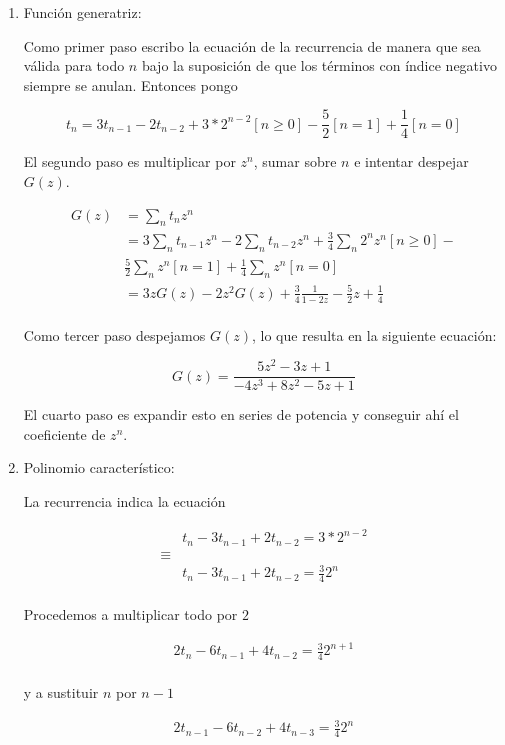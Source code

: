 \documentclass{article}
\begin{document}
\begin{enumerate}

\item Función generatriz:

Como primer paso escribo la ecuación de la recurrencia de manera que sea válida
para todo $n$ bajo la suposición de que los términos con índice negativo siempre
se anulan. Entonces pongo

\[
t_n = 3t_{n-1} - 2t_{n-2} + 3*2^{n-2} [n \geq 0] - \frac{5}{2} [n=1] + \frac{1}{4}[n=0]
\]

El segundo paso es multiplicar por $z^n$, sumar sobre $n$ e intentar despejar $G(z)$.

\begin{align*}
G(z)
  & = \sum_n t_n z^n \\
  & = 3 \sum_n t_{n-1} z^n - 2 \sum_n t_{n-2} z^n + \frac{3}{4} \sum_n 2^n z^n [n \geq 0] - \\
  &   \frac{5}{2} \sum_n z^n [n=1] + \frac{1}{4} \sum_n z^n [n=0] \\
  & = 3zG(z) - 2z^2G(z) + \frac{3}{4}\frac{1}{1-2z} - \frac{5}{2}z + \frac{1}{4} \\
\end{align*}

Como tercer paso despejamos $G(z)$, lo que resulta en la siguiente ecuación:

\[
G(z) = \frac{5z^2-3z+1}{-4z^3+8z^2-5z+1}
\]

El cuarto paso es expandir esto en series de potencia y conseguir
ahí el coeficiente de $z^n$.

\item Polinomio característico:

La recurrencia indica la ecuación

\begin{align*}
& t_n - 3t_{n-1} + 2t_{n-2} = 3*2^{n-2} \\
\equiv & \\
& t_n - 3t_{n-1} + 2t_{n-2} = \frac{3}{4} 2^n \\
\end{align*}

Procedemos a multiplicar todo por $2$

\begin{align*}
2t_n - 6t_{n-1} + 4t_{n-2} = \frac{3}{4} 2^{n+1} \\
\end{align*}

y a sustituir $n$ por $n-1$

\begin{align*}
2t_{n-1} - 6t_{n-2} + 4t_{n-3} = \frac{3}{4} 2^{n} \\
\end{align*}


\end{enumerate}
\end{document}
